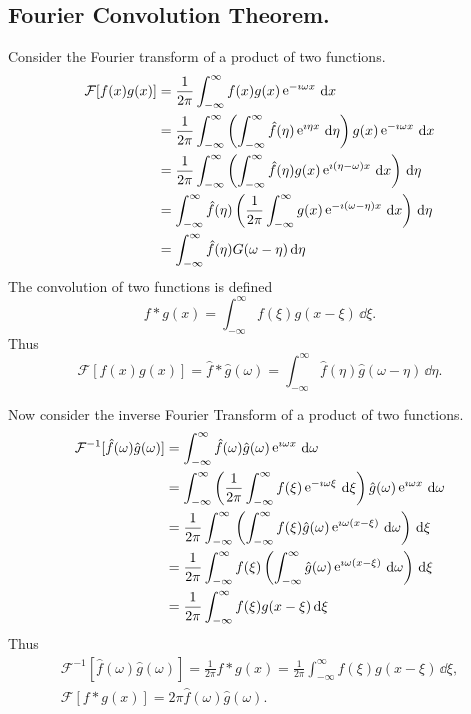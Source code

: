 \subsection{Fourier Convolution Theorem.}



Consider the Fourier transform of a product of two functions.
\begin{align*}
  \mathcal{F}[f(x)g(x)]
  &= \frac{1}{2\pi} \int_{-\infty}^\infty f(x) g(x) \mathop{\mathrm{e}}\nolimits^{-\imath \omega x}\,\mathrm{d} x 
  \\
  &= \frac{1}{2\pi} \int_{-\infty}^\infty \left( \int_{-\infty}^\infty \hat{f}(\eta) \mathop{\mathrm{e}}\nolimits^{\imath \eta x}\,\mathrm{d} \eta
  \right) g(x) \mathop{\mathrm{e}}\nolimits^{-\imath \omega x}\,\mathrm{d} x 
  \\
  &= \frac{1}{2\pi} \int_{-\infty}^\infty \left( \int_{-\infty}^\infty \hat{f}(\eta) g(x) 
    \mathop{\mathrm{e}}\nolimits^{\imath (\eta - \omega)x} \,\mathrm{d} x \right) \,\mathrm{d} \eta 
  \\
  &= \int_{-\infty}^\infty \hat{f}(\eta) \left( \frac{1}{2\pi} \int_{-\infty}^\infty g(x) \mathop{\mathrm{e}}\nolimits^{-\imath 
      (\omega - \eta) x}\,\mathrm{d} x \right)\,\mathrm{d} \eta 
  \\
  &= \int_{-\infty}^\infty \hat{f}(\eta) G(\omega - \eta)\,\mathrm{d} \eta
\end{align*}
The convolution of two functions is defined
\[ 
f * g(x) = \int_{-\infty}^\infty f(\xi) g(x-\xi)\,\dd \xi.
\]
Thus
\[ 
\boxed{ 
  \mathcal{F}[f(x)g(x)] = \hat{f} * \hat{g}(\omega) 
  = \int_{-\infty}^\infty \hat{f}(\eta) \hat{g}(\omega - \eta)\,\dd \eta.
  } 
\]






Now consider the inverse Fourier Transform of a product of two functions.
\begin{align*}
  \mathcal{F}^{-1}[\hat{f}(\omega)\hat{g}(\omega)]
  &= \int_{-\infty}^\infty \hat{f}(\omega)\hat{g}(\omega) \mathop{\mathrm{e}}\nolimits^{\imath \omega x}\,\mathrm{d} \omega 
  \\
  &= \int_{-\infty}^\infty \left(\frac{1}{2\pi} \int_{-\infty}^\infty f(\xi) \mathop{\mathrm{e}}\nolimits^{-\imath \omega \xi}\,\mathrm{d} \xi
  \right) \hat{g}(\omega) \mathop{\mathrm{e}}\nolimits^{\imath \omega x}\,\mathrm{d} \omega 
  \\
  &= \frac{1}{2\pi} \int_{-\infty}^\infty \left( \int_{-\infty}^\infty f(\xi) \hat{g}(\omega) 
    \mathop{\mathrm{e}}\nolimits^{\imath \omega(x-\xi)} \,\mathrm{d} \omega \right) \,\mathrm{d} \xi 
  \\
  &= \frac{1}{2\pi} \int_{-\infty}^\infty f(\xi) \left( 
    \int_{-\infty}^\infty \hat{g}(\omega) \mathop{\mathrm{e}}\nolimits^{\imath \omega (x-\xi)}\,\mathrm{d} \omega \right) \,\mathrm{d} \xi 
  \\
  &= \frac{1}{2\pi} \int_{-\infty}^\infty f(\xi) g(x-\xi)\,\mathrm{d} \xi 
\end{align*}
Thus
\begin{gather*} 
  \boxed{ 
    \mathcal{F}^{-1}[\hat{f}(\omega)\hat{g}(\omega)] 
    = \frac{1}{2\pi} f * g (x)
    = \frac{1}{2\pi} \int_{-\infty}^\infty f(\xi) g(x-\xi)\,\dd \xi,
    } 
  \\
  \boxed{ 
    \mathcal{F}[f * g (x)] = 2 \pi \hat{f}(\omega)\hat{g}(\omega).
    } 
\end{gather*}

